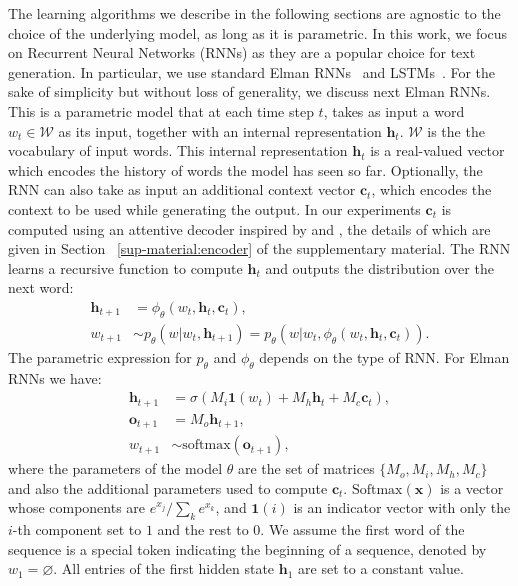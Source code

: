 \documentclass{article} \usepackage{iclr2016_conference,times}
\newcommand{\bh}{\mathbf{h}}
\newcommand{\bx}{\mathbf{x}}
\newcommand{\bc}{\mathbf{c}}
\newcommand{\bone}{\mathbf{1}}
\newcommand{\bo}{\mathbf{o}}
\begin{document}
The learning algorithms we describe in the following sections are agnostic to
the choice of the underlying model, as long as it is parametric. 
In this work, we focus on Recurrent Neural Networks (RNNs) as they are a popular choice for text generation. In particular, we use standard Elman RNNs~\citep{elman1990} and LSTMs~\citep{lstm}. For the sake of simplicity but without loss of generality, we discuss next Elman RNNs. This is a parametric 
model that at each time step $t$, takes as input a word $w_t \in \mathcal{W}$ as its input, together 
with an internal representation $\bh_t$. $\mathcal{W}$ is the the vocabulary of input words. 
This internal representation $\bh_t$ is a real-valued vector which encodes the history of 
words the model has seen so far. 
Optionally, the RNN can also take as input an  additional context vector $\bc_t$, which 
encodes the context to be used while generating the output. 
In our experiments $\bc_t$ is computed using an attentive decoder 
inspired by \cite{bahdanau-iclr2015} and \citet{rush-2015}, the details of which 
are given in Section ~\ref{sup-material:encoder} of the supplementary material. 
The RNN learns a recursive function to compute $\bh_t$ and 
outputs the distribution over the next word:
\begin{align}
    \bh_{t + 1} &= \phi_\theta(w_t, \bh_t, \bc_t),  \\
	w_{t+1} &\sim p_{\theta}(w |  w_t, \bh_{t+1}) =  p_{\theta}(w |  w_t, \phi_\theta(w_t, \bh_t, \bc_t)).
\end{align}
The parametric expression for $p_\theta$ and $\phi_\theta$ depends 
on the type of RNN. For Elman RNNs we have:
\begin{align}
\label{eq:elman-rnn}
    \bh_{t + 1} &= \sigma(M_i \bone(w_t) + M_h \bh_t + M_c \bc_t), \\
    \bo_{t+1} &= M_o \bh_{t+1}, \label{eq:softmax_input} \\
	w_{t+1} &\sim \mbox{softmax}(\bo_{t+1}),
    \label{eq:xent-distr}
\end{align}
where the parameters of the model $\theta$ are the set of matrices $\{M_o, M_i, M_h, M_c\}$ 
and also the additional parameters used to compute $\bc_t$. $\mbox{Softmax}(\bx)$ is a vector whose components are $e^{x_j} / \sum_k{e^{x_k}}$, and $\bone(i)$ is an indicator vector with only the $i$-th component set to $1$ and the rest to $0$. We assume the first word of the sequence is a special token indicating the beginning of a sequence, denoted by $w_1 = \varnothing$. All entries of the first hidden state $\bh_1$ are set to a constant value.
\end{document}
